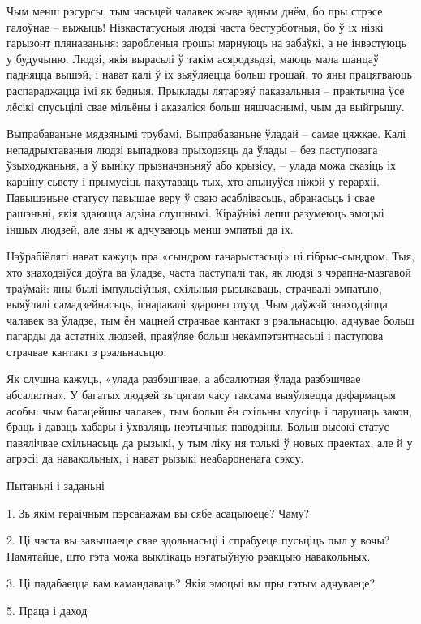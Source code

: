 Чым менш рэсурсы, тым часьцей чалавек жыве адным днём, бо пры стрэсе галоўнае – выжыць! Нізкастатусныя людзі часта бестурботныя, бо ў іх нізкі гарызонт плянаваньня: заробленыя грошы марнуюць на забаўкі, а не інвэстуюць у будучыню. Людзі, якія вырасьлі ў такім асяродзьдзі, маюць мала шанцаў падняцца вышэй, і нават калі ў іх зьяўляецца больш грошай, то яны працягваюць распараджацца імі як бедныя. Прыклады лятарэяў паказальныя – практычна ўсе лёсікі спусьцілі свае мільёны і аказаліся больш няшчаснымі, чым да выйгрышу.

Выпрабаваньне мядзянымі трубамі. Выпрабаваньне ўладай – самае цяжкае. Калі непадрыхтаваныя людзі выпадкова прыходзяць да ўлады – без паступовага ўзыходжаньня, а ў выніку прызначэньняў або крызісу, – улада можа сказіць іх карціну сьвету і прымусіць пакутаваць тых, хто апынуўся ніжэй у герархіі. Павышэньне статусу павышае веру ў сваю асаблівасьць, абранасьць і свае рашэньні, якія здаюцца адзіна слушнымі. Кіраўнікі лепш разумеюць эмоцыі іншых людзей, але яны ж адчуваюць менш эмпатыі да іх.

Нэўрабіёлягі нават кажуць пра «сындром ганарыстасьці» ці гібрыс-сындром. Тыя, хто знаходзіўся доўга ва ўладзе, часта паступалі так, як людзі з чэрапна-мазгавой траўмай: яны былі імпульсіўныя, схільныя рызыкаваць, страчвалі эмпатыю, выяўлялі самадзейнасьць, ігнаравалі здаровы глузд. Чым даўжэй знаходзіцца чалавек ва ўладзе, тым ён мацней страчвае кантакт з рэальнасьцю, адчувае больш пагарды да астатніх людзей, праяўляе больш некампэтэнтнасьці і паступова страчвае кантакт з рэальнасьцю.

Як слушна кажуць, «улада разбэшчвае, а абсалютная ўлада разбэшчвае абсалютна». У багатых людзей зь цягам часу таксама выяўляецца дэфармацыя асобы: чым багацейшы чалавек, тым больш ён схільны хлусіць і парушаць закон, браць і даваць хабары і ўхваляць неэтычныя паводзіны. Больш высокі статус павялічвае схільнасьць да рызыкі, у тым ліку ня толькі ў новых праектах, але й у агрэсіі да навакольных, і нават рызыкі неабароненага сэксу.

Пытаньні і заданьні

1. Зь якім гераічным пэрсанажам вы сябе асацыюеце? Чаму?

2. Ці часта вы завышаеце свае здольнасьці і спрабуеце пусьціць пыл у вочы? Памятайце, што гэта можа выклікаць нэгатыўную рэакцыю навакольных.

3. Ці падабаецца вам камандаваць? Якія эмоцыі вы пры гэтым адчуваеце?


5. Праца і даход


